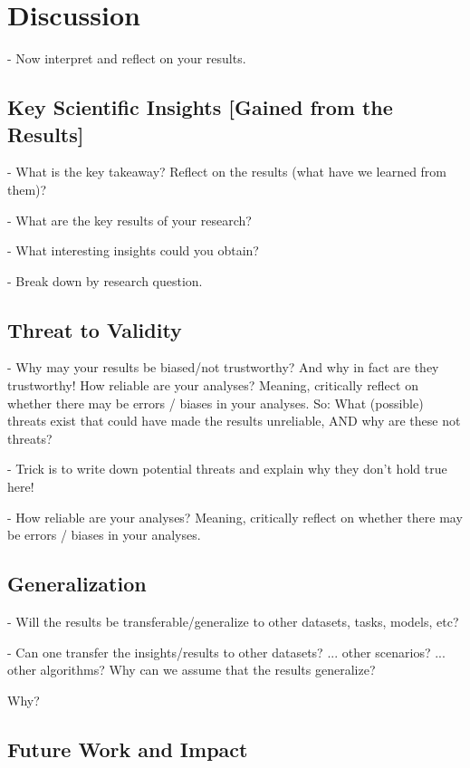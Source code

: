 \documentclass[sigconf, review, nonacm]{acmart}
\begin{document}
\section{Discussion}
\label{sec:discussion}

- Now interpret and reflect on your results.

\subsection{Key Scientific Insights [Gained from the Results]}
\label{sec:keyresults}

- What is the key takeaway? Reflect on the results (what have we learned from them)?

- What are the key results of your research?

- What interesting insights could you obtain?

- Break down by research question.

\subsection{Threat to Validity}
\label{sec:threattovalidity}

- Why may your results be biased/not trustworthy? And why in fact are they trustworthy! How reliable are your analyses? Meaning, critically reflect on whether there may be errors / biases in your analyses. So: What (possible) threats exist that could have made the results unreliable, AND why are these not threats?

- Trick is to write down potential threats and explain why they don't hold true here!

- How reliable are your analyses? Meaning, critically reflect on whether there may be errors / biases in your analyses.

\subsection{Generalization}
\label{sec:generalization}

- Will the results be transferable/generalize to other datasets, tasks, models, etc?

- Can one transfer the insights/results to other datasets? ... other scenarios? ... other algorithms? Why can we assume that the results generalize?

Why?

\subsection{Future Work and Impact}
\label{sec:futurework}
\end{document}

